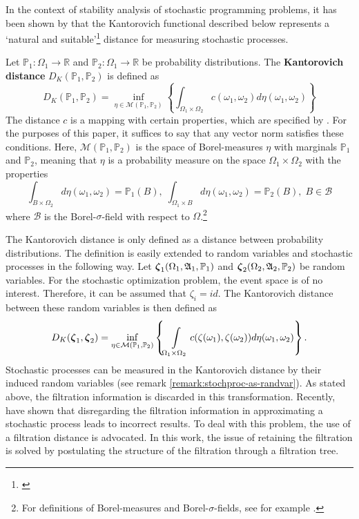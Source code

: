 In the context of stability analysis of stochastic programming problems, it has been shown by \citet{Dupacova2003} that the Kantorovich functional described below
represents a  `natural and suitable'\footnote{\citet{Dupacova2003}} distance for measuring stochastic processes.
\begin{definition}
  Let $\mathbb{P}_1:\Omega_1\rightarrow\mathbb{R}$ and $\mathbb{P}_2:\Omega_1\rightarrow\mathbb{R}$ be probability distributions.
  The \textbf{Kantorovich distance} $D_K(\mathbb{P}_1,\mathbb{P}_2)$ is defined as
  \begin{equation}
    \label{eq:define-infinitedim-kantorovich}
    D_K(\mathbb{P}_1, \mathbb{P}_2) = \inf\limits_{\eta\in\mathcal{M}(\mathbb{P}_1,\mathbb{P}_2)}\left\{\int_{\Omega_1\times\Omega_2}c(\omega_1, \omega_2)d\eta(\omega_1,\omega_2)\right\}
  \end{equation}
  The distance $c$ is a mapping with certain properties, which are specified by \citet{Dupacova2003}.
  For the purposes of this paper, it suffices to say that any vector norm satisfies these conditions.
Here, $\mathcal{M}(\mathbb{P}_1, \mathbb{P}_2)$ is the space of Borel-measures $\eta$ with marginals $\mathbb{P}_1$ and $\mathbb{P}_2$, meaning that $\eta$ is a probability measure on the space $\Omega_1\times\Omega_2$ with the properties
\begin{equation}
  \label{eq:define-borel-measures}
  \int_{B\times \Omega_2} d\eta(\omega_1,\omega_2) = \mathbb{P}_1(B),\;   \int_{\Omega_1\times B} d\eta(\omega_1,\omega_2) = \mathbb{P}_2(B),\; B \in \mathcal{B}
\end{equation}
where $\mathcal{B}$ is the Borel-$\sigma$-field with respect to $\Omega$.\footnote{For definitions of Borel-measures and Borel-$\sigma$-fields, see for example \citet{Elstrodt2007}.}
\end{definition}
The Kantorovich distance is only defined as a distance between probability distributions.
The definition is easily extended to random variables and stochastic processes in the following way.
Let $\boldsymbol\zeta_1(\Omega_1,\mathfrak{A}_1,\mathbb{P}_1)$ and $\boldsymbol\zeta_2(\Omega_2,\mathfrak{A}_2,\mathbb{P}_2)$ be random variables.
For the stochastic optimization problem, the event space is of no interest.
Therefore, it can be assumed that $\zeta_i = id$.
The Kantorovich distance between these random variables is then defined as
\begin{equation}
  \label{eq:64}
  D_K(\boldsymbol\zeta_1,\boldsymbol\zeta_2) = \inf\limits_{\eta\in\mathcal{M}(\mathbb{P}_1,\mathbb{P}_2)}\left\{\int\limits_{\Omega_1\times\Omega_2}c(\zeta(\omega_1),\zeta(\omega_2))d\eta(\omega_1,\omega_2)\right\}.
\end{equation}
Stochastic processes can be measured in the Kantorovich distance by their induced random variables (see remark \ref{remark:stochproc-as-randvar}).
As stated above, the filtration information is discarded in this transformation.
Recently, \citet{Heitsch2010} have shown that disregarding the filtration information in approximating a stochastic process leads to incorrect results.
To deal with this problem, the use of a filtration distance is advocated.
In this work, the issue of retaining the filtration is solved by postulating the structure of the filtration through a filtration tree.
